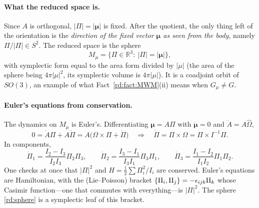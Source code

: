 \paragraph{What the reduced space is.} Since $A$ is orthogonal, $|\Pi|=|\boldsymbol\mu|$ is fixed. After the quotient, the only thing left of the orientation is the \emph{direction of the fixed vector $\boldsymbol\mu$ as seen from the body}, namely $\Pi/|\Pi|\in S^2$. The reduced space is the sphere
\begin{equation}\label{rd:sphere}
M_\mu=\{\Pi\in\mathbb R^3:\ |\Pi|=|\boldsymbol\mu|\},
\end{equation}
with symplectic form equal to the area form divided by $|\mu|$ (the area of the sphere being $4\pi|\mu|^2$, its symplectic volume is $4\pi|\mu|$). It is a coadjoint orbit of $SO(3)$, an example of what Fact~\ref{rd:fact:MWM}(ii) means when $G_\mu\neq G$.

\paragraph{Euler's equations from conservation.} The dynamics on $M_\mu$ is Euler's. Differentiating $\boldsymbol\mu=A\Pi$ with $\dot{\boldsymbol\mu}=0$ and $\dot A=A\hat\Omega$,
\[
0=\dot A\Pi+A\dot\Pi=A\big(\Omega\times\Pi+\dot\Pi\big)\quad\Longrightarrow\quad
\dot\Pi=\Pi\times\Omega=\Pi\times I^{-1}\Pi .
\]
In components,
\begin{equation}\label{rd:Euler}
\dot\Pi_1=\frac{I_2-I_3}{I_2I_3}\Pi_2\Pi_3,\qquad
\dot\Pi_2=\frac{I_3-I_1}{I_3I_1}\Pi_3\Pi_1,\qquad
\dot\Pi_3=\frac{I_1-I_2}{I_1I_2}\Pi_1\Pi_2 .
\end{equation}
One checks at once that $|\Pi|^2$ and $H=\tfrac12\sum\Pi_i^2/I_i$ are conserved. Euler's equations are Hamiltonian, with the (Lie--Poisson) bracket $\{\Pi_i,\Pi_j\}=-\epsilon_{ijk}\Pi_k$ whose Casimir function---one that commutes with everything---is $|\Pi|^2$. The sphere \eqref{rd:sphere} is a symplectic leaf of this bracket.

